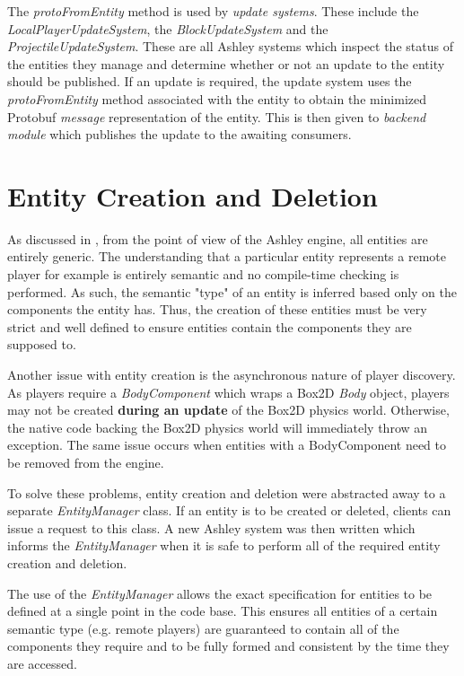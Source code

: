 The \textit{protoFromEntity} method is used by \textit{update systems}. These include the \textit{LocalPlayerUpdateSystem}, the \textit{BlockUpdateSystem} and the \textit{ProjectileUpdateSystem}. These are all Ashley systems which inspect the status of the entities they manage and determine whether or not an update to the entity should be published. If an update is required, the update system uses the \textit{protoFromEntity} method associated with the entity to obtain the minimized Protobuf \textit{message} representation of the entity. This is then given to \textit{backend module} which publishes the update to the awaiting consumers. 

\section{Entity Creation and Deletion}
As discussed in , from the point of view of the Ashley engine, all entities are entirely generic. The understanding that a particular entity represents a remote player for example is entirely semantic and no compile-time checking is performed. As such, the semantic "type" of an entity is inferred based only on the components the entity has. Thus, the creation of these entities must be very strict and well defined to ensure entities contain the components they are supposed to. 

Another issue with entity creation is the asynchronous nature of player discovery. As players require a \textit{BodyComponent} which wraps a Box2D \textit{Body} object, players may not be created \textbf{during an update} of the Box2D physics world. Otherwise, the native code backing the Box2D physics world will immediately throw an exception. The same issue occurs when entities with a BodyComponent need to be removed from the engine.  

To solve these problems, entity creation and deletion were abstracted away to a separate \textit{EntityManager} class. If an entity is to be created or deleted, clients can issue a request to this class. A new Ashley system was then written which informs the \textit{EntityManager} when it is safe to perform all of the required entity creation and deletion.

The use of the \textit{EntityManager} allows the exact specification for entities to be defined at a single point in the code base. This ensures all entities of a certain semantic type (e.g. remote players) are guaranteed to contain all of the components they require and to be fully formed and consistent by the time they are accessed. 
